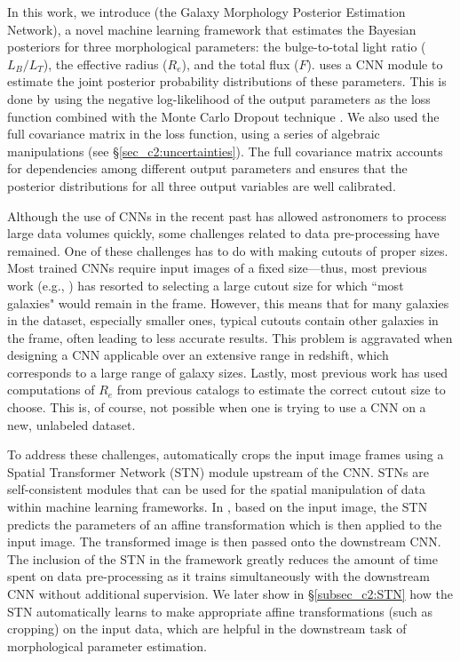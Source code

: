 In this work, we introduce \gampen{} (the Galaxy Morphology Posterior Estimation Network), a novel machine learning framework that estimates the Bayesian posteriors for three morphological parameters: the bulge-to-total light ratio ($L_B/L_T$), the effective radius ($R_e$), and the total flux ($F$).
\gampen{} uses a %
CNN module to estimate the joint posterior probability distributions of these parameters. This is done by using the negative log-likelihood of the output parameters as the loss function combined with the Monte Carlo Dropout technique \citep{gal_2016}. We also used the full covariance matrix in the loss function, using a series of algebraic manipulations (see \S \ref{sec_c2:uncertainties}). The full covariance matrix accounts for dependencies among different output parameters and ensures that the posterior distributions for all three output variables are well calibrated.

Although the use of CNNs in the recent past has allowed astronomers to process large data volumes quickly, some challenges related to data pre-processing have remained. One of these challenges has to do with making cutouts of proper sizes. Most trained CNNs require input images of a fixed size---thus, most previous work (e.g., \citealp{Cheng2021GalaxyNetworks, Vega-Ferrero2021PushingSurvey}) has resorted to selecting a large cutout size for which ``most galaxies" would remain in the frame. However, this means that for many galaxies in the dataset, especially smaller ones, typical cutouts contain other galaxies in the frame, often leading to less accurate results. This problem is aggravated when designing a CNN applicable over an extensive range in redshift, which corresponds to a large range of galaxy sizes. Lastly, most previous work has used computations of $R_e$ from previous catalogs to estimate the correct cutout size to choose. This is, of course, not possible when one is trying to use a CNN on a new, unlabeled dataset. 

To address these challenges, \gampen{} automatically crops the input image frames using a Spatial Transformer Network (STN) module upstream of the CNN. STNs are self-consistent modules that can be used for the spatial manipulation of data within machine learning frameworks. In \gampen{}, based on the input image, the STN predicts the parameters of an affine transformation which is then applied to the input image. The transformed image is then passed onto the downstream CNN.
The inclusion of the STN in the framework greatly reduces the amount of time spent on data pre-processing as it trains simultaneously with the downstream CNN without additional supervision. We later show in \S \ref{subsec_c2:STN} how the STN automatically learns to make appropriate affine transformations (such as cropping) on the input data, which are helpful in the downstream task of morphological parameter estimation.

